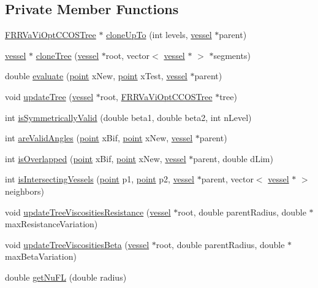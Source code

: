 \subsection*{Private Member Functions}
\begin{DoxyCompactItemize}
\item 
\hyperlink{class_f_r_r_va_vi_opt_c_c_o_s_tree}{F\+R\+R\+Va\+Vi\+Opt\+C\+C\+O\+S\+Tree} $\ast$ \hyperlink{class_f_r_r_va_vi_opt_c_c_o_s_tree_af632401d7f152f10e1bcbb0d712a7b74}{clone\+Up\+To} (int levels, \hyperlink{structvessel}{vessel} $\ast$parent)
\item 
\hyperlink{structvessel}{vessel} $\ast$ \hyperlink{class_f_r_r_va_vi_opt_c_c_o_s_tree_ac0e29742975e8046b571d6d18dbd6aa3}{clone\+Tree} (\hyperlink{structvessel}{vessel} $\ast$root, vector$<$ \hyperlink{structvessel}{vessel} $\ast$ $>$ $\ast$segments)
\item 
double \hyperlink{class_f_r_r_va_vi_opt_c_c_o_s_tree_ad2e4435cea4b58085a9c7fc391490e8c}{evaluate} (\hyperlink{structpoint}{point} x\+New, \hyperlink{structpoint}{point} x\+Test, \hyperlink{structvessel}{vessel} $\ast$parent)
\item 
void \hyperlink{class_f_r_r_va_vi_opt_c_c_o_s_tree_a5f6953a55f1539ac4899e9a2e4f2ad7f}{update\+Tree} (\hyperlink{structvessel}{vessel} $\ast$root, \hyperlink{class_f_r_r_va_vi_opt_c_c_o_s_tree}{F\+R\+R\+Va\+Vi\+Opt\+C\+C\+O\+S\+Tree} $\ast$tree)
\item 
int \hyperlink{class_f_r_r_va_vi_opt_c_c_o_s_tree_a1988a62d4a8f82c547e241dc80a14fba}{is\+Symmetrically\+Valid} (double beta1, double beta2, int n\+Level)
\item 
int \hyperlink{class_f_r_r_va_vi_opt_c_c_o_s_tree_a55d5c516893c2ac1875be023548e568b}{are\+Valid\+Angles} (\hyperlink{structpoint}{point} x\+Bif, \hyperlink{structpoint}{point} x\+New, \hyperlink{structvessel}{vessel} $\ast$parent)
\item 
int \hyperlink{class_f_r_r_va_vi_opt_c_c_o_s_tree_a92eb08cc90eab3a24397efce436ebaec}{is\+Overlapped} (\hyperlink{structpoint}{point} x\+Bif, \hyperlink{structpoint}{point} x\+New, \hyperlink{structvessel}{vessel} $\ast$parent, double d\+Lim)
\item 
int \hyperlink{class_f_r_r_va_vi_opt_c_c_o_s_tree_acfbd6fe1356a89831bfc1cc137473455}{is\+Intersecting\+Vessels} (\hyperlink{structpoint}{point} p1, \hyperlink{structpoint}{point} p2, \hyperlink{structvessel}{vessel} $\ast$parent, vector$<$ \hyperlink{structvessel}{vessel} $\ast$ $>$ neighbors)
\item 
void \hyperlink{class_f_r_r_va_vi_opt_c_c_o_s_tree_ac07772412c7554ae527a756ec652a44f}{update\+Tree\+Viscosities\+Resistance} (\hyperlink{structvessel}{vessel} $\ast$root, double parent\+Radius, double $\ast$max\+Resistance\+Variation)
\item 
void \hyperlink{class_f_r_r_va_vi_opt_c_c_o_s_tree_acd9ceb8141bb7df82101a33ae5180b63}{update\+Tree\+Viscosities\+Beta} (\hyperlink{structvessel}{vessel} $\ast$root, double parent\+Radius, double $\ast$max\+Beta\+Variation)
\item 
double \hyperlink{class_f_r_r_va_vi_opt_c_c_o_s_tree_a05093832a77a583f373747ac4787808d}{get\+Nu\+FL} (double radius)
\end{DoxyCompactItemize}
